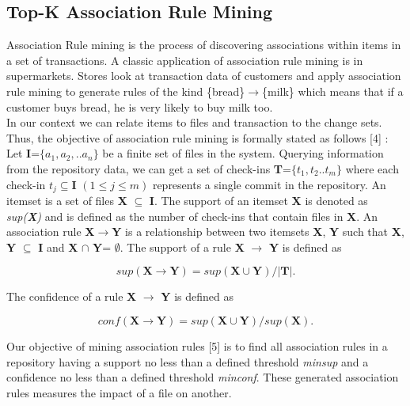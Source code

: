\subsection{Top-K Association Rule Mining}

Association Rule mining is the process of discovering associations within items in a set of transactions. A classic application of association rule mining is in supermarkets. Stores look at transaction data of customers and apply association rule mining to generate rules of the kind \{bread\}$\rightarrow$\{milk\} which means that if a customer buys bread, he is very likely to buy milk too.\\
In our context we can relate items to files and transaction to the change sets. Thus, the objective of association rule mining is formally stated as follows [4] :\\
Let \textbf{I}=$\{a_{1},a_{2},..a_{n}\}$ be a finite set of files in the system. Querying information from the repository data, we can get a set of check-ins \textbf{T}=$\{t_{1},t_{2}..t_{m}\}$ where each check-in $t_{j}\subseteq\textbf{I}$ $(1 \le j \le m)$ represents a single commit in the repository. An itemset is a set of files \textbf{X} $\subseteq$ \textbf{I}. The support of an itemset \textbf{X} is denoted as \textit{sup(\textbf{X})} and is defined as the number of check-ins that contain files in \textbf{X}. An association rule \textbf{X}$\rightarrow$\textbf{Y} is a relationship between two itemsets \textbf{X}, \textbf{Y} such that \textbf{X}, \textbf{Y} $\subseteq$ \textbf{I} and \textbf{X} $\cap$ \textbf{Y}= $\emptyset$. The support of a rule \textbf{X} $\rightarrow$ \textbf{Y} is defined as 

\begin{equation}
\textit{sup}(\textbf{X} \rightarrow \textbf{Y}) = \textit{sup}(\textbf{X}\cup\textbf{Y}) / |\textbf{T}|.
\end{equation}
 

The confidence of a rule \textbf{X} $\rightarrow$ \textbf{Y} is defined as 

\begin{equation}
conf(\textbf{X} \rightarrow \textbf{Y}) = \textit{sup}(\textbf{X}\cup\textbf{Y}) / \textit{sup}(\textbf{X}). 
\end{equation}

Our objective of mining association rules [5] is to find all association rules in a repository having a support no less than a defined threshold \textit{minsup} and a confidence no less
than a defined threshold \textit{minconf}. These generated association rules measures the impact of a file on another. \\

